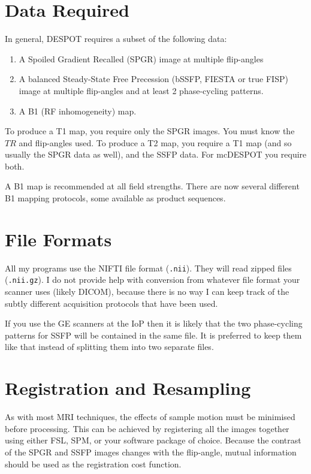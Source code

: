 \documentclass{report}
\begin{document}
\section{Data Required}

In general, DESPOT requires a subset of the following data:
\begin{enumerate} \itemsep1pt \parskip0pt 
  \item A Spoiled Gradient Recalled (SPGR) image at multiple flip-angles
  \item A balanced Steady-State Free Precession (bSSFP, FIESTA or true FISP) image at multiple flip-angles and at least 2 phase-cycling patterns.
  \item A B1 (RF inhomogeneity) map.
\end{enumerate}

To produce a T1 map, you require only the SPGR images. You must know the $TR$ and flip-angles used. To produce a T2 map, you require a T1 map (and so usually the SPGR data as well), and the SSFP data. For mcDESPOT you require both.

A B1 map is recommended at all field strengths. There are now several different B1 mapping protocols, some available as product sequences.

\section{File Formats}

All my programs use the NIFTI file format (\texttt{.nii}). They will read zipped files (\texttt{.nii.gz}). I do not provide help with conversion from whatever file format your scanner uses (likely DICOM), because there is no way I can keep track of the subtly different acquisition protocols that have been used.

If you use the GE scanners at the IoP then it is likely that the two phase-cycling patterns for SSFP will be contained in the same file. It is preferred to keep them like that instead of splitting them into two separate files.

\section{Registration and Resampling}

As with most MRI techniques, the effects of sample motion must be minimised before processing. This can be achieved by registering all the images together using either FSL, SPM, or your software package of choice. Because the contrast of the SPGR and SSFP images changes with the flip-angle, mutual information should be used as the registration cost function.
\end{document}
